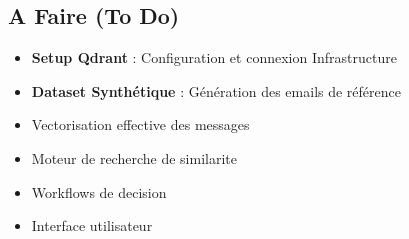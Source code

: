 \documentclass[11pt]{article}
\begin{document}
\subsection{A Faire (To Do)}
\begin{itemize}
    \item \textbf{Setup Qdrant} : Configuration et connexion Infrastructure
    \item \textbf{Dataset Synthétique} : Génération des emails de référence
    \item Vectorisation effective des messages
    \item Moteur de recherche de similarite
    \item Workflows de decision
    \item Interface utilisateur
\end{itemize}
\end{document}
